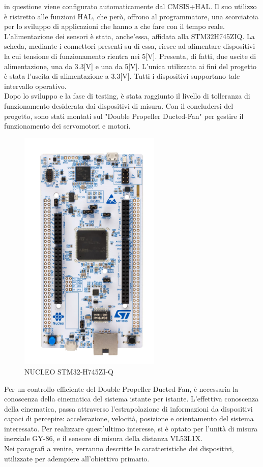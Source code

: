 in questione viene configurato automaticamente dal CMSIS+HAL. Il suo utilizzo è ristretto alle funzioni HAL, che però, offrono al programmatore, una scorciatoia per lo sviluppo di applicazioni che hanno a che fare con il tempo reale.\\
L'alimentazione dei sensori è stata, anche'essa, affidata alla STM32H745ZIQ. La scheda, mediante i connettori presenti su di essa, riesce ad alimentare dispositivi la cui tensione di funzionamento rientra nei 5[V]. Presenta, di fatti, due uscite di alimentazione, una da 3.3[V] e una da 5[V]. L'unica utilizzata ai fini del progetto è stata l'uscita di alimentazione a 3.3[V]. Tutti i dispositivi supportano tale intervallo operativo.\\
Dopo lo sviluppo e la fase di testing, è stata raggiunto il livello di tolleranza di funzionamento desiderata dai dispositivi di misura. Con il concludersi del progetto, sono stati montati sul "Double Propeller Ducted-Fan" per gestire il funzionamento dei servomotori e motori.
 
\begin{figure}[H]
    \centering
    \includegraphics[width = 0.6\textwidth]{images/Immagine_1_relazione__IMMAGINE_STM32H745ZIQ.jpg}
    \caption{NUCLEO STM32-H745ZI-Q}
    \label{fig:etichetta}
\end{figure}
Per un controllo efficiente del Double Propeller Ducted-Fan, è necessaria la conoscenza della cinematica del sistema istante per istante.
L'effettiva conoscenza della cinematica, passa attraverso l'estrapolazione di informazioni da dispositivi capaci di percepire: accelerazione, velocità, posizione e orientamento del sistema interessato.
Per realizzare quest'ultimo interesse, si è optato per l'unità di misura inerziale GY-86, e il sensore di misura della distanza VL53L1X.\\
Nei paragrafi a venire, verranno descritte le caratteristiche dei dispositivi, utilizzate per adempiere all'obiettivo primario.
